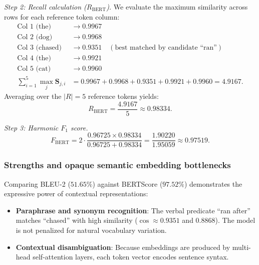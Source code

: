\documentclass[../../main.tex]{subfiles}
\begin{document}
\textit{Step 2: Recall calculation ($R_{\text{BERT}}$).}
We evaluate the maximum similarity across rows for each reference token column:
\begin{align}
\text{Col 1 (the)}    &\to 0.9967 \nonumber \\
\text{Col 2 (dog)}    &\to 0.9968 \nonumber \\
\text{Col 3 (chased)} &\to 0.9351 \quad (\text{best matched by candidate ``ran''}) \nonumber \\
\text{Col 4 (the)}    &\to 0.9921 \nonumber \\
\text{Col 5 (cat)}    &\to 0.9960 \nonumber \\
\sum_{i=1}^5 \max_j \mathbf{S}_{j, i} &= 0.9967 + 0.9968 + 0.9351 + 0.9921 + 0.9960 = 4.9167.
\end{align}
Averaging over the $|R| = 5$ reference tokens yields:
\begin{equation}
R_{\text{BERT}} = \frac{4.9167}{5} \approx \mathbf{0.98334}.
\end{equation}

\textit{Step 3: Harmonic $F_1$ score.}
\begin{equation}
F_{\text{BERT}} = 2 \cdot \frac{0.96725 \times 0.98334}{0.96725 + 0.98334} = \frac{1.90220}{1.95059} \approx \mathbf{0.97519}.
\end{equation}

\subsubsection{Strengths and opaque semantic embedding bottlenecks}
Comparing BLEU-2 ($51.65\%$) against BERTScore ($97.52\%$) demonstrates the expressive power of contextual representations:
\begin{itemize}
    \item \textbf{Paraphrase and synonym recognition}: The verbal predicate ``ran after'' matches ``chased'' with high similarity ($\cos \approx 0.9351$ and $0.8868$). The model is not penalized for natural vocabulary variation.
    \item \textbf{Contextual disambiguation}: Because embeddings are produced by multi-head self-attention layers, each token vector encodes sentence syntax.
\end{itemize}
\end{document}
